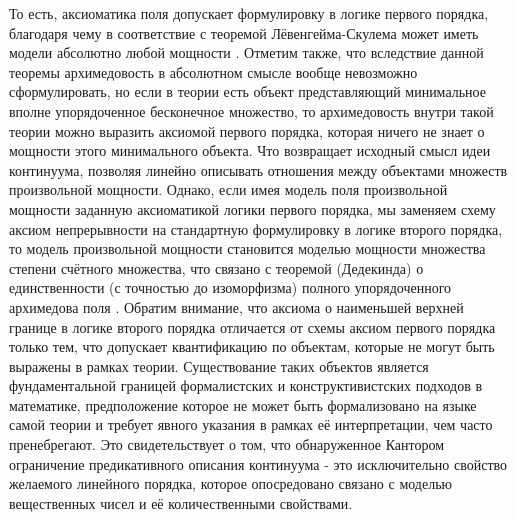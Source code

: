 \documentclass[12pt]{article}
\begin{document}
То есть, аксиоматика поля допускает формулировку в логике первого порядка, благодаря чему в соответствие с теоремой Лёвенгейма-Скулема может иметь модели абсолютно любой мощности \cite{fraenkel-skolem}. Отметим также, что вследствие данной теоремы архимедовость в абсолютном смысле вообще невозможно сформулировать, но если в теории есть объект представляющий минимальное вполне упорядоченное бесконечное множество, то архимедовость внутри такой теории можно выразить аксиомой первого порядка, которая ничего не знает о мощности этого минимального объекта. Что возвращает исходный смысл идеи континуума, позволяя линейно описывать отношения между объектами множеств произвольной мощности. Однако, если имея модель поля произвольной мощности заданную аксиоматикой логики первого порядка, мы заменяем схему аксиом непрерывности на стандартную формулировку в логике второго порядка, то модель произвольной мощности становится моделью мощности множества степени счётного множества, что связано с теоремой (Дедекинда) о единственности (с точностью до изоморфизма) полного упорядоченного архимедова поля \cite{matan-rational-uniqueness}. Обратим внимание, что аксиома о наименьшей верхней границе в логике второго порядка отличается от схемы аксиом первого порядка только тем, что допускает квантификацию по объектам, которые не могут быть выражены в рамках теории. Существование таких объектов является фундаментальной границей формалистских и конструктивистских подходов в математике, предположение которое не может быть формализовано на языке самой теории и требует явного указания в рамках её интерпретации, чем часто пренебрегают. Это свидетельствует о том, что обнаруженное Кантором ограничение предикативного описания континуума - это исключительно свойство желаемого линейного порядка, которое опосредовано связано с моделью вещественных чисел и её количественными свойствами. 
\end{document}
